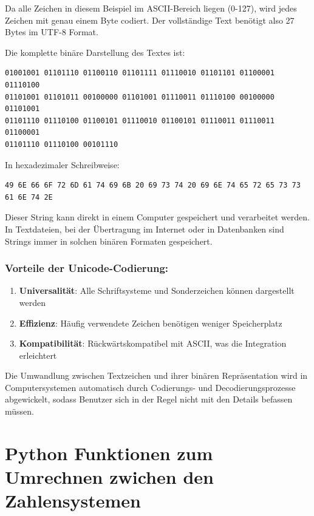 \documentclass[
  nswissgerman,
  a4paper,
  DIV=11,
  numbers=noendperiod,
  ngerman]{scrreprt}
\providecommand{\tightlist}{%
  \setlength{\itemsep}{0pt}\setlength{\parskip}{0pt}}
\begin{document}
Da alle Zeichen in diesem Beispiel im ASCII-Bereich liegen (0-127), wird
jedes Zeichen mit genau einem Byte codiert. Der vollständige Text
benötigt also 27 Bytes im UTF-8 Format.

Die komplette binäre Darstellung des Textes ist:

\begin{verbatim}
01001001 01101110 01100110 01101111 01110010 01101101 01100001 01110100 
01101001 01101011 00100000 01101001 01110011 01110100 00100000 01101001 
01101110 01110100 01100101 01110010 01100101 01110011 01110011 01100001 
01101110 01110100 00101110
\end{verbatim}

In hexadezimaler Schreibweise:

\begin{verbatim}
49 6E 66 6F 72 6D 61 74 69 6B 20 69 73 74 20 69 6E 74 65 72 65 73 73 61 6E 74 2E
\end{verbatim}

Dieser String kann direkt in einem Computer gespeichert und verarbeitet
werden. In Textdateien, bei der Übertragung im Internet oder in
Datenbanken sind Strings immer in solchen binären Formaten gespeichert.

\subsection{Vorteile der
Unicode-Codierung:}\label{vorteile-der-unicode-codierung}

\begin{enumerate}
\def\labelenumi{\arabic{enumi}.}
\tightlist
\item
  \textbf{Universalität}: Alle Schriftsysteme und Sonderzeichen können
  dargestellt werden
\item
  \textbf{Effizienz}: Häufig verwendete Zeichen benötigen weniger
  Speicherplatz
\item
  \textbf{Kompatibilität}: Rückwärtskompatibel mit ASCII, was die
  Integration erleichtert
\end{enumerate}

Die Umwandlung zwischen Textzeichen und ihrer binären Repräsentation
wird in Computersystemen automatisch durch Codierungs- und
Decodierungsprozesse abgewickelt, sodass Benutzer sich in der Regel
nicht mit den Details befassen müssen.

\chapter{Python Funktionen zum Umrechnen zwichen den
Zahlensystemen}\label{python-funktionen-zum-umrechnen-zwichen-den-zahlensystemen}
\end{document}
